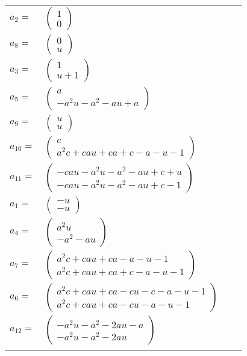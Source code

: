 \documentclass[1p]{elsarticle_modified}
\theoremstyle{definition}
\begin{document}
\begin{tabular}{m{7pt} m{180pt} m{7pt} m{180pt} }
\flushright $a_{2}=$&$\begin{pmatrix}1\\0\end{pmatrix}$ \\
\flushright $a_{8}=$&$\begin{pmatrix}0\\u\end{pmatrix}$ \\
\flushright $a_{3}=$&$\begin{pmatrix}1\\u+1\end{pmatrix}$ \\
\flushright $a_{5}=$&$\begin{pmatrix}a\\- a^2 u- a^2- a u+a\end{pmatrix}$ \\
\flushright $a_{9}=$&$\begin{pmatrix}u\\u\end{pmatrix}$ \\
\flushright $a_{10}=$&$\begin{pmatrix}c\\a^2 c+c a u+c a+c- a- u-1\end{pmatrix}$ \\
\flushright $a_{11}=$&$\begin{pmatrix}- c a u- a^2 u- a^2- a u+c+u\\- c a u- a^2 u- a^2- a u+c-1\end{pmatrix}$ \\
\flushright $a_{1}=$&$\begin{pmatrix}- u\\- u\end{pmatrix}$ \\
\flushright $a_{4}=$&$\begin{pmatrix}a^2 u\\- a^2- a u\end{pmatrix}$ \\
\flushright $a_{7}=$&$\begin{pmatrix}a^2 c+c a u+c a- a- u-1\\a^2 c+c a u+c a+c- a- u-1\end{pmatrix}$ \\
\flushright $a_{6}=$&$\begin{pmatrix}a^2 c+c a u+c a- c u- c- a- u-1\\a^2 c+c a u+c a- c u- a- u-1\end{pmatrix}$ \\
\flushright $a_{12}=$&$\begin{pmatrix}- a^2 u- a^2-2 a u- a\\- a^2 u- a^2-2 a u\end{pmatrix}$\\&\end{tabular}
\end{document}

